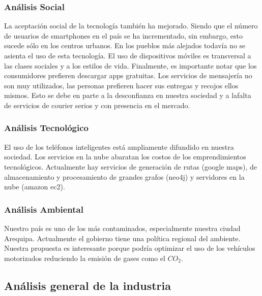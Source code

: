\subsubsection{Análisis Social}
La aceptación social de la tecnología también ha mejorado. Siendo que el número de usuarios de smartphones en el país se ha incrementado, sin embargo, esto sucede sólo en los centros urbanos. En los pueblos más alejados todavía no se asienta el uso de esta tecnología. El uso de dispositivos móviles es transversal a las clases sociales y a los estilos de vida. Finalmente, es importante notar que los consumidores prefieren descargar apps gratuitas.
Los servicios de mensajería no son muy utilizados, las personas prefieren hacer sus entregas y recojos ellos mismos. Esto se debe en parte a la desconfianza en nuestra sociedad y a lafalta de servicios de courier serios y con presencia en el mercado.

\subsubsection{Análisis Tecnológico}
El uso de los teléfonos inteligentes está ampliamente difundido en nuestra sociedad. Los servicios en la nube abaratan los costos de los emprendimientos tecnológicos. Actualmente hay servicios de generación de rutas (google maps), de almacenamiento y procesamiento de grandes grafos (neo4j) y servidores en la nube (amazon ec2).


\subsubsection{Análisis Ambiental}
Nuestro país es uno de los más contaminados, especialmente nuestra ciudad Arequipa. Actualmente el gobierno tiene una política regional del ambiente. Nuestra propuesta es interesante porque podría optimizar el uso de los vehículos motorizados reduciendo la emisión de gases como el $CO_2$.


\subsection{Análisis general de la industria}
